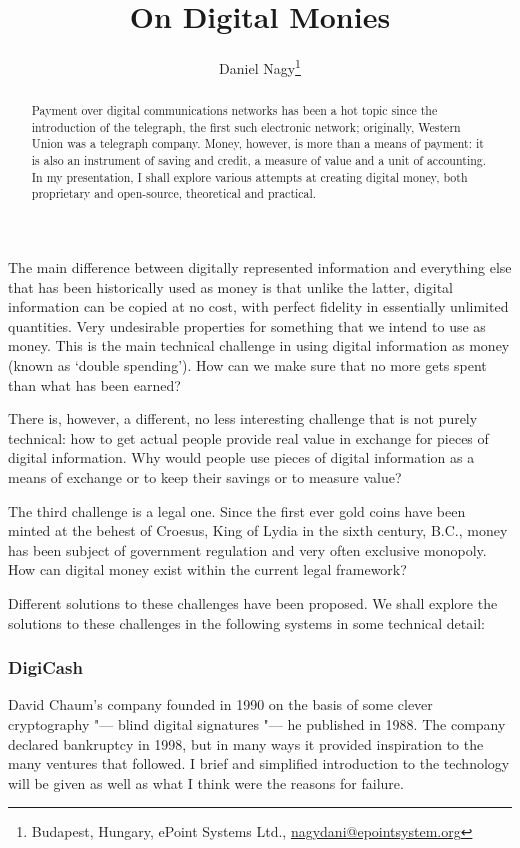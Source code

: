 \documentclass[10pt, a5paper]{article}
\begin{document}
\title{On Digital Monies}

\author{Daniel Nagy\footnote{Budapest, Hungary, ePoint Systems Ltd., \url{nagydani@epointsystem.org}}}
\date{}
\maketitle
\renewcommand{\abstractname}{Abstract}
\begin{abstract}
Payment over digital communications networks has been a hot topic since
the introduction of the telegraph, the first such electronic network;
originally, Western Union was a telegraph company. Money, however, is
more than a means of payment: it is also an instrument of saving and
credit, a measure of value and a unit of accounting. In my presentation,
I shall explore various attempts at creating digital money, both
proprietary and open-source, theoretical and practical.
\end{abstract}

The main difference between digitally represented information and
everything else that has been historically used as money is that unlike
the latter, digital information can be copied at no cost, with perfect
fidelity in essentially unlimited quantities. Very undesirable
properties for something that we intend to use as money. This is the
main technical challenge in using digital information as money (known as
`double spending'). How can we make sure that no more gets spent than
what has been earned?

There is, however, a different, no less interesting challenge that is
not purely technical: how to get actual people provide real value in
exchange for pieces of digital information. Why would people use pieces
of digital information as a means of exchange or to keep their savings
or to measure value?

The third challenge is a legal one. Since the first ever gold coins have
been minted at the behest of Croesus, King of Lydia in the sixth
century, B.C., money has been subject of government regulation and very
often exclusive monopoly. How can digital money exist within the current
legal framework?

Different solutions to these challenges have been proposed. We shall
explore the solutions to these challenges in the following systems in
some technical detail:

\subsubsection*{DigiCash}
David Chaum's company founded in 1990 on the basis of some clever
cryptography "--- blind digital signatures "--- he published in 1988. The
company declared bankruptcy in 1998, but in many ways it provided
inspiration to the many ventures that followed. I brief and simplified
introduction to the technology will be given as well as what I think
were the reasons for failure.
\end{document}
